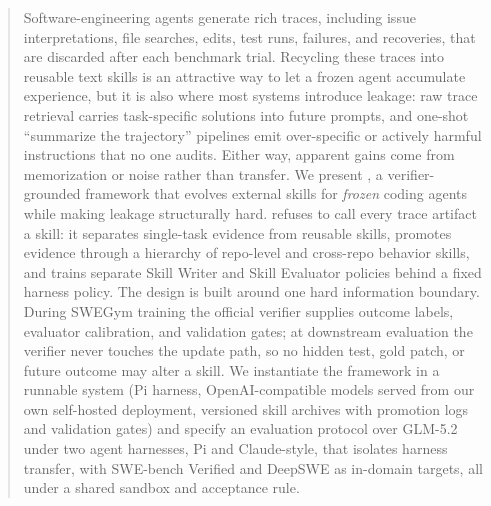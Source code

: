 \begin{abstract}
Software-engineering agents generate rich traces, including issue
interpretations, file searches, edits, test runs, failures, and recoveries,
that are discarded after each benchmark trial. Recycling these traces into
reusable text skills is an attractive way to let a frozen agent accumulate
experience, but it is also where most systems introduce leakage: raw trace
retrieval carries task-specific solutions into future prompts, and one-shot
``summarize the trajectory'' pipelines emit over-specific or actively harmful
instructions that no one audits. Either way, apparent gains come from
memorization or noise rather than transfer. We present \method{}, a
verifier-grounded framework that evolves external skills for \emph{frozen}
coding agents while making leakage structurally hard. \method{} refuses to call
every trace artifact a skill: it separates single-task evidence from reusable
skills, promotes evidence through a hierarchy of repo-level and cross-repo
behavior skills, and trains separate Skill Writer and Skill Evaluator
policies behind a fixed harness policy. The design is built around one hard
information boundary. During SWEGym training the official verifier supplies
outcome labels, evaluator calibration, and validation gates; at downstream
evaluation the verifier never touches the update path, so no hidden test, gold
patch, or future outcome may alter a skill. We instantiate the framework in a
runnable system (Pi harness, OpenAI-compatible models served from our own
self-hosted deployment, versioned skill archives with promotion logs and
validation gates) and specify an evaluation protocol over GLM-5.2 under two
agent harnesses, Pi and Claude-style, that isolates harness transfer, with
SWE-bench Verified and DeepSWE as in-domain targets, all under a shared
sandbox and acceptance rule.
\end{abstract}
